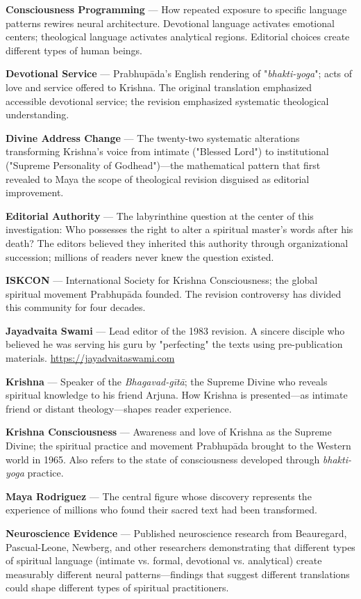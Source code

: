 \documentclass[12pt,twoside]{book}
\begin{document}
\textbf{Consciousness Programming} — How repeated exposure to specific language patterns rewires neural architecture. Devotional language activates emotional centers; theological language activates analytical regions. Editorial choices create different types of human beings.

\textbf{Devotional Service} — Prabhupāda's English rendering of "\emph{bhakti-yoga}"; acts of love and service offered to Krishna. The original translation emphasized accessible devotional service; the revision emphasized systematic theological understanding.

\textbf{Divine Address Change} — The twenty-two systematic alterations transforming Krishna's voice from intimate ("Blessed Lord") to institutional ("Supreme Personality of Godhead")—the mathematical pattern that first revealed to Maya the scope of theological revision disguised as editorial improvement.

\textbf{Editorial Authority} — The labyrinthine question at the center of this investigation: Who possesses the right to alter a spiritual master's words after his death? The editors believed they inherited this authority through organizational succession; millions of readers never knew the question existed.

\textbf{ISKCON} — International Society for Krishna Consciousness; the global spiritual movement Prabhupāda founded. The revision controversy has divided this community for four decades.

\textbf{Jayadvaita Swami} — Lead editor of the 1983 revision. A sincere disciple who believed he was serving his guru by "perfecting" the texts using pre-publication materials. \url{https://jayadvaitaswami.com}

\textbf{Krishna} — Speaker of the \emph{Bhagavad-gītā}; the Supreme Divine who reveals spiritual knowledge to his friend Arjuna. How Krishna is presented—as intimate friend or distant theology—shapes reader experience.

\textbf{Krishna Consciousness} — Awareness and love of Krishna as the Supreme Divine; the spiritual practice and movement Prabhupāda brought to the Western world in 1965. Also refers to the state of consciousness developed through \emph{bhakti-yoga} practice.

\textbf{Maya Rodriguez} — The central figure whose discovery represents the experience of millions who found their sacred text had been transformed.

\textbf{Neuroscience Evidence} — Published neuroscience research from Beauregard, Pascual-Leone, Newberg, and other researchers demonstrating that different types of spiritual language (intimate vs. formal, devotional vs. analytical) create measurably different neural patterns—findings that suggest different translations could shape different types of spiritual practitioners.
\end{document}
